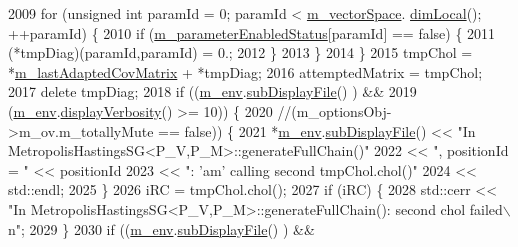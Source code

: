 \begin{DoxyCode}
{{2009             \textcolor{keywordflow}{for} (\textcolor{keywordtype}{unsigned} \textcolor{keywordtype}{int} paramId = 0; paramId < \hyperlink{class_q_u_e_s_o_1_1_metropolis_hastings_s_g_a2ef17fbfc6a156f03bbfad044b5a75f5}{m\_vectorSpace}.
      \hyperlink{class_q_u_e_s_o_1_1_vector_space_a5829a1f4f996f8307c840b705144d666}{dimLocal}(); ++paramId) \{
2010               \textcolor{keywordflow}{if} (\hyperlink{class_q_u_e_s_o_1_1_metropolis_hastings_s_g_afce8eeadae98935c72727b3640e88a31}{m\_parameterEnabledStatus}[paramId] == \textcolor{keyword}{false}) \{
2011                 (*tmpDiag)(paramId,paramId) = 0.;
2012               \}
2013             \}
2014           \}
2015           tmpChol = *\hyperlink{class_q_u_e_s_o_1_1_metropolis_hastings_s_g_a1c73b49339c8a1015d95a890d7882331}{m\_lastAdaptedCovMatrix} + *tmpDiag;
2016           attemptedMatrix = tmpChol;
2017           \textcolor{keyword}{delete} tmpDiag;
2018           \textcolor{keywordflow}{if} ((\hyperlink{class_q_u_e_s_o_1_1_metropolis_hastings_s_g_ac8ea061e55b920e0c8f9bce5c3f20e52}{m\_env}.\hyperlink{class_q_u_e_s_o_1_1_base_environment_a8a0064746ae8dddfece4229b9ad374d6}{subDisplayFile}()        ) &&
2019               (\hyperlink{class_q_u_e_s_o_1_1_metropolis_hastings_s_g_ac8ea061e55b920e0c8f9bce5c3f20e52}{m\_env}.\hyperlink{class_q_u_e_s_o_1_1_base_environment_a1fe5f244fc0316a0ab3e37463f108b96}{displayVerbosity}() >= 10)) \{
2020       \textcolor{comment}{//(m\_optionsObj->m\_ov.m\_totallyMute == false)) \{}
2021             *\hyperlink{class_q_u_e_s_o_1_1_metropolis_hastings_s_g_ac8ea061e55b920e0c8f9bce5c3f20e52}{m\_env}.\hyperlink{class_q_u_e_s_o_1_1_base_environment_a8a0064746ae8dddfece4229b9ad374d6}{subDisplayFile}() << \textcolor{stringliteral}{"In
       MetropolisHastingsSG<P\_V,P\_M>::generateFullChain()"}
2022                                     << \textcolor{stringliteral}{", positionId = "}  << positionId
2023                                     << \textcolor{stringliteral}{": 'am' calling second tmpChol.chol()"}
2024                                     << std::endl;
2025           \}
2026           iRC = tmpChol.chol();
2027           \textcolor{keywordflow}{if} (iRC) \{
2028             std::cerr << \textcolor{stringliteral}{"In MetropolisHastingsSG<P\_V,P\_M>::generateFullChain(): second chol failed\(\backslash\)n"};
2029           \}
2030           \textcolor{keywordflow}{if} ((\hyperlink{class_q_u_e_s_o_1_1_metropolis_hastings_s_g_ac8ea061e55b920e0c8f9bce5c3f20e52}{m\_env}.\hyperlink{class_q_u_e_s_o_1_1_base_environment_a8a0064746ae8dddfece4229b9ad374d6}{subDisplayFile}()        ) &&
}}
\end{DoxyCode}
